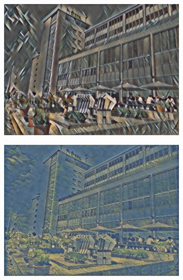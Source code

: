 \begin{figure}[H]
\begin{subfigure}[h]{0.24\textwidth}
        \includegraphics[width=\textwidth]{resources/content/experiments/htw-vgg16_still_life_with_liqueur_bottle.jpg}
    \end{subfigure}
    \begin{subfigure}[h]{0.24\textwidth}
        \centering
        \includegraphics[width=\textwidth]{resources/content/experiments/htw-vgg16_the_olive_trees.jpg}
    \end{subfigure}



\end{figure}
